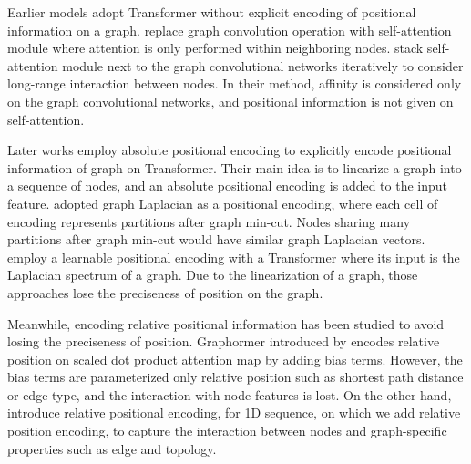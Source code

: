 \documentclass[letterpaper]{article} \usepackage{aaai23}  \usepackage{times}  \usepackage{helvet}  \usepackage{courier}  \usepackage[hyphens]{url}  \usepackage{graphicx} \urlstyle{rm} \def\UrlFont{\rm}  \usepackage{natbib}  \usepackage{caption} \frenchspacing  \setlength{\pdfpagewidth}{8.5in} \setlength{\pdfpageheight}{11in} \usepackage{algorithm}
\begin{document}
Earlier models adopt Transformer without explicit encoding of positional information on a graph.
\citeauthor{velivckovic2017graph}  replace graph convolution operation with self-attention module where attention
is only performed within neighboring nodes.
\citeauthor{rong2020self} stack self-attention module next to the graph convolutional networks iteratively to consider long-range interaction between nodes.
In their method, affinity is considered only on the graph convolutional networks, and positional information is not given on self-attention.


Later works employ absolute positional encoding to explicitly encode positional information of graph on Transformer.
Their main idea is to linearize a graph into a sequence of nodes, and an absolute positional encoding is added to the input feature.
\citeauthor{gt_dwivedi2020generalization} adopted graph Laplacian as a positional encoding, where each cell of encoding represents partitions after graph min-cut. 
Nodes sharing many partitions after graph min-cut would have similar graph Laplacian vectors.
\citeauthor{san_kreuzer2021rethinking} employ a learnable positional encoding with a Transformer where its input is the Laplacian spectrum of a graph. Due to the linearization of a graph, those approaches lose the preciseness of position on the graph.


Meanwhile, encoding relative positional information has been studied to avoid losing the preciseness of position.
Graphormer introduced by \citeauthor{ying2021transformers} encodes relative position on scaled dot product attention map by adding bias terms. 
However, the bias terms are parameterized only relative position such as shortest path distance or edge type, and the interaction with node features is lost.
On the other hand, \citeauthor{shaw2018self} introduce relative positional encoding, 
for 1D sequence, on which we add relative position encoding, to capture
the interaction between nodes and graph-specific properties such as edge and topology.
\end{document}
